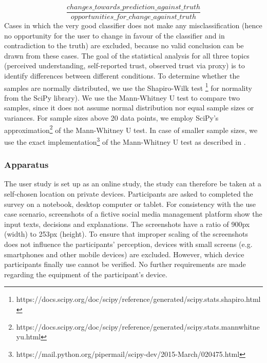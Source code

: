 \[ \frac{changes\_towards\_prediction\_against\_truth}{opportunities\_for\_change\_against\_truth} \]
Cases in which the very good classifier does not make any misclassification (hence no opportunity for the user to change in favour of the classifier and in contradiction to the truth) are excluded, because no valid conclusion can be drawn from these cases.\newline
The goal of the statistical analysis for all three topics (perceived understanding, self-reported trust, observed trust via proxy) is to identify differences between different conditions. To determine whether the samples are normally distributed, we use the Shapiro-Wilk test \footnote{https://docs.scipy.org/doc/scipy/reference/generated/scipy.stats.shapiro.html} for normality from the SciPy library). We use the Mann-Whitney U test to compare two samples, since it does not assume normal distribution nor equal sample sizes or variances. For sample sizes above 20 data points, we employ SciPy's approximation\footnote{https://docs.scipy.org/doc/scipy/reference/generated/scipy.stats.mannwhitneyu.html} of the Mann-Whitney U test. In case of smaller sample sizes, we use the exact implementation\footnote{https://mail.python.org/pipermail/scipy-dev/2015-March/020475.html} of the Mann-Whitney U test as described in \cite{cheung1997mann}.

\subsubsection{Apparatus}
The user study is set up as an online study, the study can therefore be taken at a self-chosen location on private devices. Participants are asked to completed the survey on a notebook, desktop computer or tablet. For consistency with the use case scenario, screenshots of a fictive social media management platform show the input texts, decisions and explanations. The screenshots have a ratio of 900px (width) to 253px (height). To ensure that improper scaling of the screenshots does not influence the participants' perception, devices with small screens (e.g. smartphones and other mobile devices) are excluded. However, which device participants finally use cannot be verified. No further requirements are made regarding the equipment of the participant's device.








